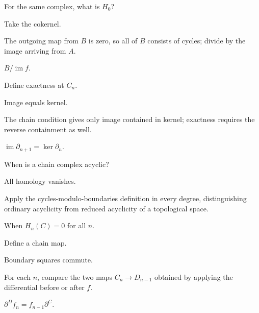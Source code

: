 \begin{exercise}\label{exr:viii16-08}
For the same complex, what is \(H_0\)?
\end{exercise}
\begin{hint}
Take the cokernel.

The outgoing map from \(B\) is zero, so all of \(B\) consists of cycles; divide by the image arriving from \(A\).
\end{hint}
\begin{solution}
\(B/\operatorname{im}f\).
\end{solution}

\begin{exercise}\label{exr:viii16-09}
Define exactness at \(C_n\).
\end{exercise}
\begin{hint}
Image equals kernel.

The chain condition gives only image contained in kernel; exactness requires the reverse containment as well.
\end{hint}
\begin{solution}
\(\operatorname{im}\partial_{n+1}=\ker\partial_n\).
\end{solution}

\begin{exercise}\label{exr:viii16-10}
When is a chain complex acyclic?
\end{exercise}
\begin{hint}
All homology vanishes.

Apply the cycles-modulo-boundaries definition in every degree, distinguishing ordinary acyclicity from reduced acyclicity of a topological space.
\end{hint}
\begin{solution}
When \(H_n(C)=0\) for all \(n\).
\end{solution}

\begin{exercise}\label{exr:viii16-11}
Define a chain map.
\end{exercise}
\begin{hint}
Boundary squares commute.

For each \(n\), compare the two maps \(C_n\to D_{n-1}\) obtained by applying the differential before or after \(f\).
\end{hint}
\begin{solution}
\(\partial^Df_n=f_{n-1}\partial^C\).
\end{solution}


